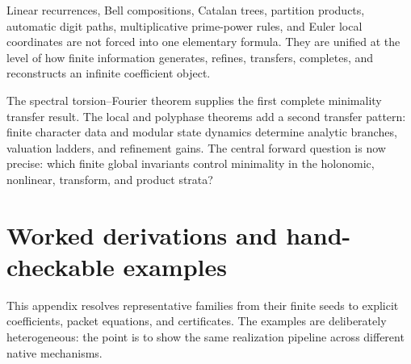 \documentclass[11pt]{article}
\theoremstyle{definition}\newtheorem{definition}[theorem]{Definition}\newtheorem{example}[theorem]{Example}\newtheorem{construction}[theorem]{Construction}\newtheorem{algorithm}[theorem]{Algorithm}\newtheorem{conjecture}[theorem]{Conjecture}\newtheorem{problem}[theorem]{Problem}
\theoremstyle{remark}\newtheorem{remark}[theorem]{Remark}\newtheorem{boundary}[theorem]{Boundary}\newtheorem{certificate}[theorem]{Computational Certificate}\newtheorem{classical}[theorem]{Classical Input}\newtheorem{principle}[theorem]{Structural Principle}
\begin{document}
Linear recurrences, Bell compositions, Catalan trees, partition products, automatic digit paths, multiplicative prime-power rules, and Euler local coordinates are not forced into one elementary formula.  They are unified at the level of how finite information generates, refines, transfers, completes, and reconstructs an infinite coefficient object.

The spectral torsion--Fourier theorem supplies the first complete minimality transfer result. The local and polyphase theorems add a second transfer pattern: finite character data and modular state dynamics determine analytic branches, valuation ladders, and refinement gains. The central forward question is now precise: which finite global invariants control minimality in the holonomic, nonlinear, transform, and product strata?


\appendix
\section{Worked derivations and hand-checkable examples}

This appendix resolves representative families from their finite seeds to explicit coefficients, packet equations, and certificates.  The examples are deliberately heterogeneous: the point is to show the same realization pipeline across different native mechanisms.
\end{document}
